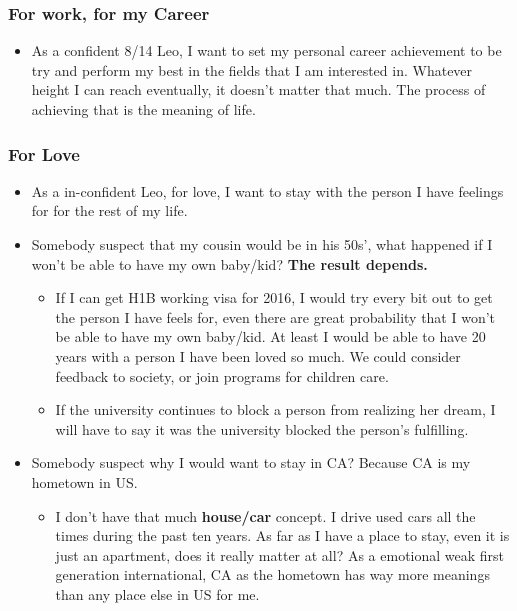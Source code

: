\documentclass[9pt,b5paper]{article}
\begin{document}
\subsubsection{For work, for my Career}
\label{sec-9-2-2}
\begin{itemize}
\item As a confident 8/14 Leo, I want to set my personal career achievement to be try and perform my best in the fields that I am interested in. Whatever height I can reach eventually, it doesn't matter that much. The process of achieving that is the meaning of life.
\end{itemize}
\subsubsection{For Love}
\label{sec-9-2-3}
\begin{itemize}
\item As a in-confident Leo, for love, I want to stay with the person I have feelings for for the rest of my life.
\item Somebody suspect that my cousin would be in his 50s', what happened if I won't be able to have my own baby/kid? \textbf{The result depends.}
\begin{itemize}
\item If I can get H1B working visa for 2016, I would try every bit out to get the person I have feels for, even there are great probability that I won't be able to have my own baby/kid. At least I would be able to have 20 years with a person I have been loved so much. We could consider feedback to society, or join programs for children care.
\item If the university continues to block a person from realizing her dream, I will have to say it was the university blocked the person's fulfilling.
\end{itemize}
\item Somebody suspect why I would want to stay in CA? Because CA is my hometown in US. 
\begin{itemize}
\item I don't have that much \textbf{house/car} concept. I drive used cars all the times during the past ten years. As far as I have a place to stay, even it is just an apartment, does it really matter at all? As a emotional weak first generation international, CA as the hometown has way more meanings than any place else in US for me.
\end{itemize}
\end{itemize}
\end{document}
